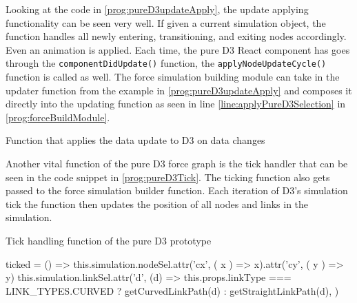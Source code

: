 Looking at the code in \ref{prog:pureD3updateApply}, the update applying functionality can be seen very well. If given a current simulation object, the function handles all newly entering, transitioning, and exiting nodes accordingly. Even an animation is applied. Each time, the pure D3 React component has goes through the \texttt{componentDidUpdate()} function, the \texttt{applyNodeUpdateCycle()} function is called as well. The force simulation building module can take in the updater function from the example in \ref{prog:pureD3updateApply} and composes it directly into the updating function as seen in line \ref{line:applyPureD3Selection} in \ref{prog:forceBuildModule}.

\begin{program}[th]
\caption{Function that applies the data update to D3 on data changes}
\label{prog:pureD3updateApply}
\end{program}

Another vital function of the pure D3 force graph is the tick handler that can be seen in the code snippet in \ref{prog:pureD3Tick}. The ticking function also gets passed to the force simulation builder function. Each iteration of D3's simulation tick the function then updates the position of all nodes and links in the simulation.

\begin{program}[th]
\caption{Tick handling function of the pure D3 prototype}
\label{prog:pureD3Tick}
\begin{JsCode}
ticked = () => {
  this.simulation.nodeSel.attr('cx', ({ x }) => x).attr('cy', ({ y }) => y)
  this.simulation.linkSel.attr('d', (d) =>
    this.props.linkType === LINK_TYPES.CURVED ? getCurvedLinkPath(d) : getStraightLinkPath(d),
  )
}
\end{JsCode}
\end{program}

